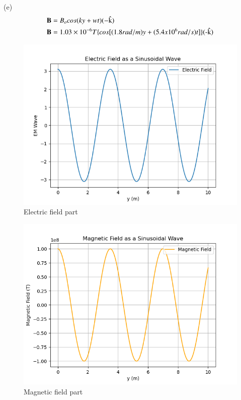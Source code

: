 \documentclass[journal,12pt,twocolumn]{IEEEtran}
\theoremstyle{remark}
\begin{document}
(e)
\begin{align}
	\textbf{B}&=B_ocos(ky+wt)(-\text{\^k}) \\
	\notag \textbf{B}&=1.03\times10^{-6}T\{cos[(1.8rad/m)y+(5.4x10^{6}rad/s)t]\}(\text{-\^k})
\end{align}
\begin{figure}[h]
\centering
\includegraphics[width=1.25\columnwidth]{Ewave.png}
\caption{Electric field part}
\label{solution}
\end{figure}



\begin{figure}[h]
\centering
\includegraphics[width=1.25\columnwidth]{Mwave.png}
\caption{Magnetic field part}
\label{solution}
\end{figure}
\end{document}
